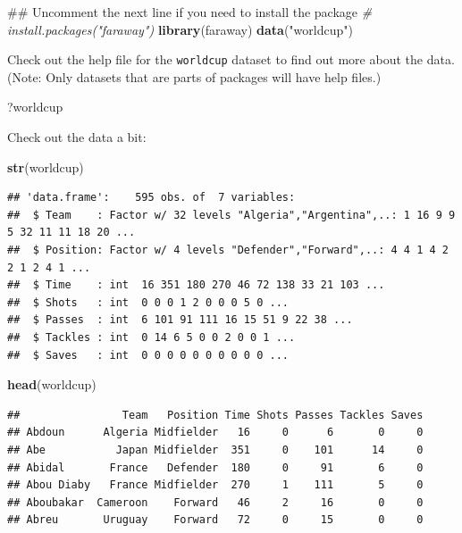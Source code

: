 \documentclass[]{book}
\makeatletter
\newenvironment{Shaded}{\begin{snugshade}}{\end{snugshade}}
\newcommand{\KeywordTok}[1]{\textcolor[rgb]{0.13,0.29,0.53}{\textbf{{#1}}}}
\newcommand{\StringTok}[1]{\textcolor[rgb]{0.31,0.60,0.02}{{#1}}}
\newcommand{\CommentTok}[1]{\textcolor[rgb]{0.56,0.35,0.01}{\textit{{#1}}}}
\newcommand{\NormalTok}[1]{{#1}}
\newenvironment{kframe}{%
\medskip{}
\setlength{\fboxsep}{.8em}
 \def\at@end@of@kframe{}%
 \ifinner\ifhmode%
  \def\at@end@of@kframe{\end{minipage}}%
  \begin{minipage}{\columnwidth}%
 \fi\fi%
 \def\FrameCommand##1{\hskip\@totalleftmargin \hskip-\fboxsep
 \colorbox{shadecolor}{##1}\hskip-\fboxsep
     \hskip-\linewidth \hskip-\@totalleftmargin \hskip\columnwidth}%
 \MakeFramed {\advance\hsize-\width
   \@totalleftmargin\z@ \linewidth\hsize
   \@setminipage}}%
 {\par\unskip\endMakeFramed%
 \at@end@of@kframe}
\renewenvironment{Shaded}{\begin{kframe}}{\end{kframe}}
\makeatother
\begin{document}
\begin{Shaded}
\begin{Highlighting}[]
\NormalTok{## Uncomment the next line if you need to install the package}
\CommentTok{# install.packages("faraway")}
\KeywordTok{library}\NormalTok{(faraway)}
\KeywordTok{data}\NormalTok{(}\StringTok{"worldcup"}\NormalTok{)}
\end{Highlighting}
\end{Shaded}

Check out the help file for the \texttt{worldcup} dataset to find out
more about the data. (Note: Only datasets that are parts of packages
will have help files.)

\begin{Shaded}
\begin{Highlighting}[]
\NormalTok{?worldcup}
\end{Highlighting}
\end{Shaded}

Check out the data a bit:

\begin{Shaded}
\begin{Highlighting}[]
\KeywordTok{str}\NormalTok{(worldcup)}
\end{Highlighting}
\end{Shaded}

\begin{verbatim}
## 'data.frame':    595 obs. of  7 variables:
##  $ Team    : Factor w/ 32 levels "Algeria","Argentina",..: 1 16 9 9 5 32 11 11 18 20 ...
##  $ Position: Factor w/ 4 levels "Defender","Forward",..: 4 4 1 4 2 2 1 2 4 1 ...
##  $ Time    : int  16 351 180 270 46 72 138 33 21 103 ...
##  $ Shots   : int  0 0 0 1 2 0 0 0 5 0 ...
##  $ Passes  : int  6 101 91 111 16 15 51 9 22 38 ...
##  $ Tackles : int  0 14 6 5 0 0 2 0 0 1 ...
##  $ Saves   : int  0 0 0 0 0 0 0 0 0 0 ...
\end{verbatim}

\begin{Shaded}
\begin{Highlighting}[]
\KeywordTok{head}\NormalTok{(worldcup)}
\end{Highlighting}
\end{Shaded}

\begin{verbatim}
##                Team   Position Time Shots Passes Tackles Saves
## Abdoun      Algeria Midfielder   16     0      6       0     0
## Abe           Japan Midfielder  351     0    101      14     0
## Abidal       France   Defender  180     0     91       6     0
## Abou Diaby   France Midfielder  270     1    111       5     0
## Aboubakar  Cameroon    Forward   46     2     16       0     0
## Abreu       Uruguay    Forward   72     0     15       0     0
\end{verbatim}
\end{document}

